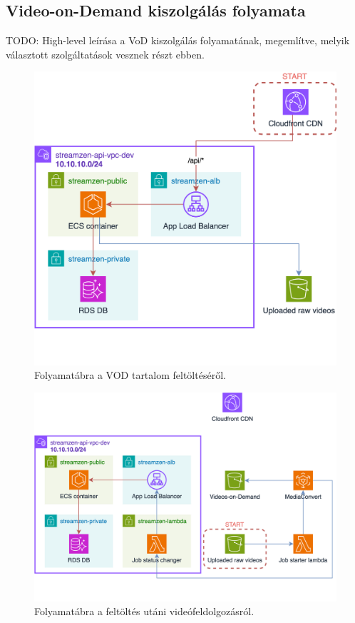 \subsection{Video-on-Demand kiszolgálás folyamata}

TODO: High-level leírása a VoD kiszolgálás folyamatának, megemlítve, melyik választott szolgáltatások vesznek részt ebben.

\begin{figure}[ht]
	\centering
	\includegraphics[width=120mm, keepaspectratio]{figures/dipterv_vod1.png}
	\caption{Folyamatábra a VOD tartalom feltöltéséről.}
	\label{fig:vod1}
\end{figure}

\begin{figure}[ht]
	\centering
	\includegraphics[width=120mm, keepaspectratio]{figures/dipterv_vod2.png}
	\caption{Folyamatábra a feltöltés utáni videófeldolgozásról.}
	\label{fig:vod2}
\end{figure}

